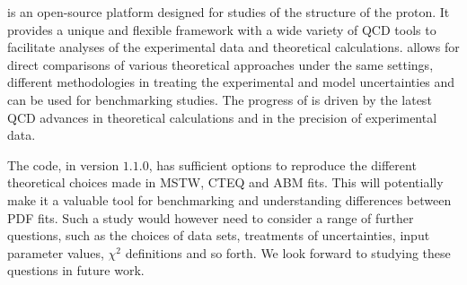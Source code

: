 
\label{sec:summary}
\fitter is an open-source platform designed for studies of the structure of the proton.
It provides a unique and flexible framework with a wide variety of QCD tools to 
facilitate analyses of the experimental data and theoretical calculations. 
\fitter allows for direct comparisons of various theoretical approaches under the same settings,
different methodologies in treating the experimental and model uncertainties and can be used for benchmarking studies.
The progress of \fitter is driven by the latest QCD advances in theoretical calculations and in the precision of experimental data.

The \fitter code, in version $1.1.0$, has sufficient options to reproduce the different theoretical choices made in MSTW, CTEQ and ABM fits. This will potentially make it a  
valuable tool for benchmarking and understanding differences between PDF fits. Such a study would however need to consider a range of further questions, such as the choices of
data sets, treatments of uncertainties, input parameter values, $\chi^2$ definitions and so forth. We look forward to studying these questions in future work.


